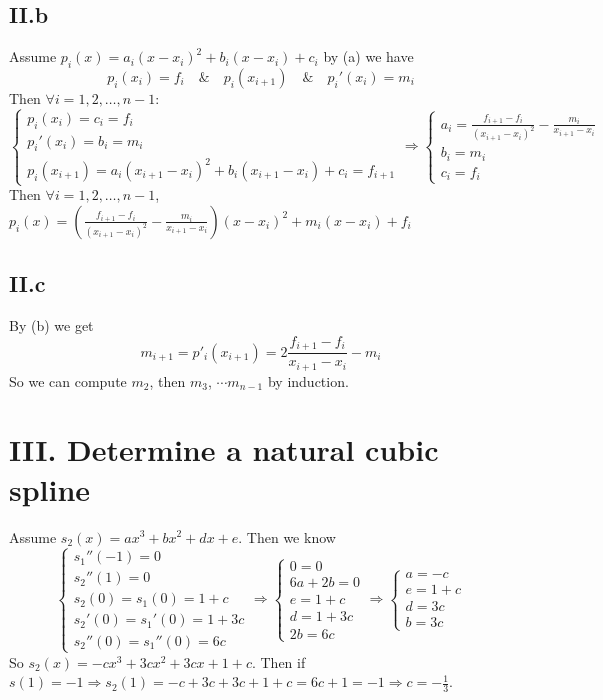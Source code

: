 \documentclass[a4paper]{article}
\begin{document}
\subsection*{II.b}
Assume $p_i(x) = a_i (x-x_i)^2 + b_i (x-x_i) + c_i$ by (a) we have
\[
p_i(x_i) = f_i \quad \& \quad p_i(x_{i+1}) \quad \& \quad
p_i'(x_i) = m_i
\]
Then $\forall i = 1,2,\ldots,n-1$:
\[
\begin{cases}
p_i(x_i) = c_i = f_i\\
p_i'(x_i) = b_i = m_i\\
p_i(x_{i+1}) = a_i(x_{i+1} - x_i)^2+b_i(x_{i+1} - x_i)+c_i = f_{i+1}
\end{cases}
\Rightarrow
\begin{cases}
a_i = \frac{f_{i+1} - f_i}{(x_{i+1} - x_i)^2} - \frac{m_i}{x_{i+1} - x_i}\\
b_i = m_i \\
c_i = f_i
\end{cases}
\]
Then $\forall i = 1,2,\ldots,n-1$, $p_i(x) = (\frac{f_{i+1} - f_i}{(x_{i+1} - x_i)^2} - 
\frac{m_i}{x_{i+1} - x_i})(x-x_i)^2 + m_i(x-x_i) + f_i$

\subsection*{II.c}
By (b) we get 
\[
m_{i+1} = p'_i(x_{i+1}) = 2\frac{f_{i+1} - f_i}{x_{i+1} - x_i} - m_i
\]
So we can compute $m_2$, then $m_3$, $\cdots m_{n-1}$ by induction.


\section*{III. Determine a natural cubic spline}
Assume $s_2(x) = ax^3+bx^2+dx+e$. Then we know 
\[
\begin{cases}
s_1''(-1) = 0 \\
s_2''(1) = 0 \\
s_2(0) = s_1(0) = 1+c \\
s_2'(0) = s_1'(0) = 1+3c \\
s_2''(0) = s_1''(0) = 6c
\end{cases}
\Rightarrow
\begin{cases}
0 = 0 \\
6a+2b = 0 \\
e = 1+c \\
d = 1+3c \\
2b = 6c
\end{cases}
\Rightarrow
\begin{cases}
a = -c\\
e = 1+c \\
d = 3c \\
b = 3c
\end{cases}
\]
So $s_2(x) = -cx^3 + 3cx^2 + 3cx + 1+c$. Then if $s(1) = -1 
\Rightarrow s_2(1) = -c + 3c +3c +1+c = 6c+1 = -1 \Rightarrow c = -\frac{1}{3}$.
\end{document}

